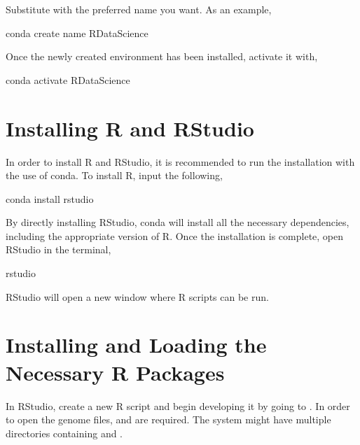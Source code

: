 \documentclass[letterpaper,10pt,english]{sphinxhowto}
\begin{document}
Substitute  with the preferred name you want. As an example,

\begin{sphinxVerbatim}[commandchars=\\\{\}]
\PYGZdl{} conda create \PYGZhy{}\PYGZhy{}name R\PYGZhy{}Data\PYGZhy{}Science
\end{sphinxVerbatim}

Once the newly created environment has been installed, activate it with,

\begin{sphinxVerbatim}[commandchars=\\\{\}]
\PYGZdl{} conda activate R\PYGZhy{}Data\PYGZhy{}Science
\end{sphinxVerbatim}


\part{Installing R and RStudio}
\label{\detokenize{index:installing-r-and-rstudio}}
In order to install R and RStudio, it is recommended to run the installation with the use of conda. To install R, input the following,

\begin{sphinxVerbatim}[commandchars=\\\{\}]
\PYGZdl{} conda install rstudio
\end{sphinxVerbatim}

By directly installing RStudio, conda will install all the necessary dependencies, including the appropriate version of R. Once the installation is complete, open RStudio in the terminal,

\begin{sphinxVerbatim}[commandchars=\\\{\}]
\PYGZdl{} rstudio
\end{sphinxVerbatim}

RStudio will open a new window where R scripts can be run.


\part{Installing and Loading the Necessary R Packages}
\label{\detokenize{index:installing-and-loading-the-necessary-r-packages}}
In RStudio, create a new R script and begin developing it by going to . In order to open the genome  files,  and  are required. The system might have multiple directories containing  and .
\end{document}
